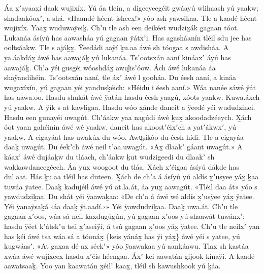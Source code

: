 \begin{pairs}
\begin{Leftside}
Áa x̱ʼayaax̱í daak wujixíx.
Yú áa tlein, a digeeyeegéit gwáayú wlihaash yú yaakw; shadaakóox̱ʼ, a shá.
«\!Haandé héent isheex!\!» yóo ash yawsiḵaa.
Tle a kaa\-dé héent wujixíx.
Yaax̱ wuduwaÿeiḵ.
Chʼu tle ash een deikéet wudzix̱ák g̱agaan tóot.
\pend
\pstart
{}Lukanáa ásíyú has aawasháa yú g̱agaan ÿátxʼi.
Has ag̱asháanín tléil sdu jee has ool\-tsáakw.
Tle s ajáḵx̱.
Ÿeedádi aaÿí ḵu.aa áwé sh tóog̱aa s awdisháa.
A ya.áakdáx̱ áwé has aawajáḵ yú lukanáa.
Tsʼootsxán aaní kináaxʼ áyú has aawajáḵ.
Chʼa ÿéi gusgéi wóoshdáx̱ awu̬lisʼóow.
Ách áwé lukanáa áa shaÿandihéin.
Tsʼootsxán aaní, tle áxʼ áwé l gooháa.
Du éesh aaní, a kináa wug̱axíxín, yú g̱agaan yéi yandusḵéich:
«\!Héidu i éesh aaní.\!»
Wáa nanée sáwé ÿát has aawa.oo.
Hasdu shukát áwé ÿatán hasdu éesh yaagú, xóots yaakw.
Ḵuwa.áx̱ch yú yaakw.
A ÿík s at kawligaa.
Hasdu wóo x̱ánde daneit a ÿeedé yéi wududzinei.
Hasdu een g̱una\-yéi uwagút.
Chʼáakw yaa nagúdi áwé ḵux̱ akoodadzéeych.
X̱ách óot yaan g̱ahéinín áwé wé yaakw, daneit has akoostʼéix̱ʼch a yatʼákwxʼ, yú yaakw.
\pend
\pstart
{}A eig̱ayáat has uwaḵúx̱ du wóo.
Awu̬si\-kóo du éesh hídi.
Tle a eig̱ayáa daaḵ uwagút.
Du éekʼch áwé neil tʼaa.uwagút.
«\!Ax̱ dlaakʼ gáant uwagút.\!»
A káaxʼ áwé dujáaḵw du tláach, chʼáakw ḵut wudzigeedi du dlaakʼ sh waḵkawdaneegéech.
Áa yux̱ woogoot du tláa.
X̱ách xʼéig̱aa ásíyú dáḵde has dul.aat.
Hás ḵu.aa tléil has duteen.
X̱ách de chʼa á ásíyú yú aldís x̱ʼusyee yáx̱ ḵaa tuwáa ÿatee. 
Daaḵ kadujéil áwé yú at.la.át, áa yux̱ aawagút.
«\!Tléil daa át\!» yóo s yawdudzi\-ḵaa.
Du shát yéi ÿaawaḵaa:
«\!De chʼa á áwé wé aldís x̱ʼusÿee yáx̱ ÿatee.
Yéi ÿanaÿsaḵá ‹\!áa daaḵ ÿi.aadí.\!›\!»
Yéi ÿawdudziḵaa.
Daaḵ uwa.át.
\pend
\pstart
{}Chʼu tle g̱agaan x̱ʼoos, wáa sá neil kax̱du\-gúg̱ún, yú g̱agaan x̱ʼoos yú shaawát tuwánxʼ;
hasdu ÿéet kʼátskʼu tsú x̱ʼaseiÿí, á tsú g̱agaan x̱ʼoos yáx̱ ÿatee.
Chʼu tle neilxʼ yan has ḵéi áwé tsa wáa sá a tóonáx̱ \{keis yánáx̱ has ÿi yáx̱\} áwé yéi s yatee, yú ḵugwáasʼ.
«\!At g̱ax̱aa dé ax̱ séekʼ\!» yóo ÿaawaḵaa yú aanḵáawu.
Tlax̱ sh kastáa xwáa áwé wujixeex hasdu x̱ʼéis héeng̱aa.
Áxʼ kei aawatán gijook ḵínaÿi.
A kaadé aawatsaaḵ.
Yoo yan kaawatán x̱éilʼ kaax̱, tléil sh kawushkook yú ḵáa.

\end{Leftside}
\end{pairs}

